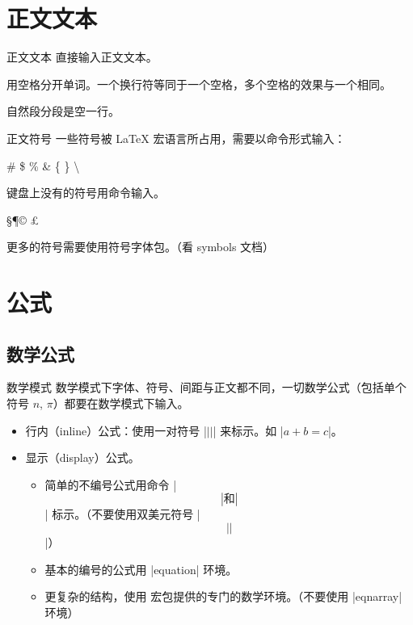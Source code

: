 \section{正文文本}

\begin{frame}{正文文本}
直接输入正文文本。

用空格分开单词。一个换行符等同于一个空格，多个空格的效果与一个相同。

自然段分段是空一行。
\end{frame}

\begin{frame}[fragile]{正文符号}
一些符号被 \LaTeX{} 宏语言所占用，需要以命令形式输入：
\begin{democode}
\# \$ \% \& \{ \}
\textbackslash
\end{democode}

键盘上没有的符号用命令输入。
\begin{democode}
\S \dag \ddag \P \copyright
\textbullet \textregistered
\texttrademark \pounds
\end{democode}

更多的符号需要使用符号字体包。（看 symbols 文档）
\end{frame}

\section{公式}

\subsection{数学公式}

\begin{frame}[fragile]{数学模式}
数学模式下字体、符号、间距与正文都不同，一切数学公式（包括单个符号 $n$, $\pi$）都要在数学模式下输入。
\begin{itemize}
\item 行内（inline）公式：使用一对符号 |$| |$| 来标示。如 |$a+b=c$|。
\item 显示（display）公式。
\begin{itemize}
\item 简单的不编号公式用命令 |\[| 和 |\]| 标示。（不要使用双美元符号 |$$| |$$|）
\item 基本的编号的公式用 |equation| 环境。
\item 更复杂的结构，使用  宏包提供的专门的数学环境。（不要使用 |eqnarray| 环境）
\end{itemize}
\end{itemize}
\end{frame}

